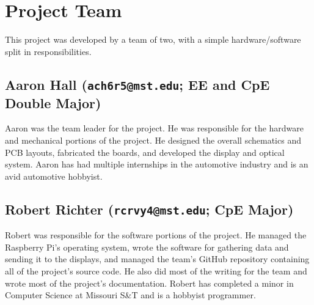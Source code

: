 \chapter{Project Team}


This project was developed by a team of two, with a simple hardware/software
split in responsibilities.

\section{Aaron Hall (\texttt{ach6r5@mst.edu}; EE and CpE Double Major)}

Aaron was the team leader for the project. He was responsible for
the hardware and mechanical portions of the project.
He designed the overall schematics and PCB layouts, fabricated the boards,
and developed the display and optical system. Aaron has had multiple internships
in the automotive industry and is an avid automotive hobbyist.

\section{Robert Richter (\texttt{rcrvy4@mst.edu}; CpE Major)}

Robert was responsible for the software portions of
the project. He managed the Raspberry Pi's operating system, wrote the software
for gathering data and sending it to the displays, and managed the team's
GitHub repository containing all of the project's source code. He also did most
of the writing for the team and wrote most of the project's documentation.
Robert has completed a minor in Computer Science at Missouri S\&T and is a
hobbyist programmer.
